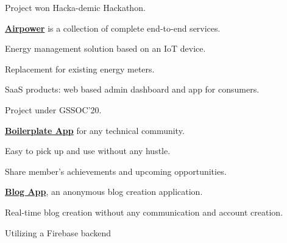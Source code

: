 \documentclass[]{deedy-resume-reversed}
\begin{document}
\begin{minipage}[t]{0.6\textwidth}
\descript{}
\begin{tightemize}
\item Project won Hacka-demic Hackathon.
\item \textbf{\href{https://airpower.ishandeveloper.com/}{Airpower}} is a collection of complete end-to-end services. 
\item Energy management solution based on an IoT device.
\item Replacement for existing energy meters.
\item SaaS products: web based admin dashboard and app for consumers.
\end{tightemize}
\sectionsep

\descript{}
\begin{tightemize}
\item Project under GSSOC'20.
\item \textbf{\href{https://github.com/smaranjitghose/girlscript_app}{Boilerplate App}} for any technical community.
\item Easy to pick up and use without any hustle.
\item Share member’s achievements and upcoming opportunities.
\end{tightemize}
\sectionsep

\descript{}
\begin{tightemize}
\item \textbf{\href{http://www.chit-chat.net/}{Blog App}}, an anonymous blog creation application.
\item Real-time blog creation without any communication and account creation.
\item Utilizing a Firebase backend
\end{tightemize}
\sectionsep




\end{minipage}
\end{document}
